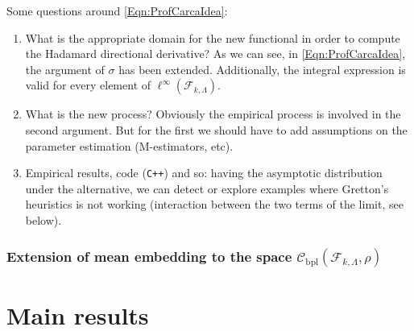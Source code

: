 	Some questions around \eqref{Eqn:ProfCarcaIdea}:
	\begin{enumerate}
		\item What is the appropriate domain for the new functional in order to compute the Hadamard directional derivative? As we can see, in \eqref{Eqn:ProfCarcaIdea}, the argument of $\sigma$ has been extended. Additionally, the integral expression is valid for every element of $\ell^{\infty}\left(\mathcal{F}_{k,\Lambda}\right)$.
		\item What is the new process? Obviously the empirical process is involved in the second argument. But for the first we should have to add assumptions on the parameter estimation (M-estimators, etc).
		\item Empirical results, code (\verb!C++!) and so: having the asymptotic distribution under the alternative, we can detect or explore examples where Gretton's heuristics is not working (interaction between the two terms of the limit, see below).
	\end{enumerate}
		\subsubsection*{Extension of mean embedding to the space $\mathcal{C}_{\operatorname{bpl}}\left(\mathcal{F}_{k,\Lambda},\rho\right)$}
\section{Main results}
